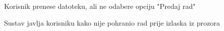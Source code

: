 \begin{packed_item}
\begin{packed_item}
\begin{packed_enum}
							\end{packed_enum}
							
							\item[5.a]  Korisnik prenese datoteku, ali ne odabere opciju "Predaj rad"
							\item[] \begin{packed_enum}
								
								\item Sustav javlja korisniku kako nije pohranio rad prije izlaska iz prozora
								
							\end{packed_enum}
							
						\end{packed_item}               
						
					\end{packed_item}
					
